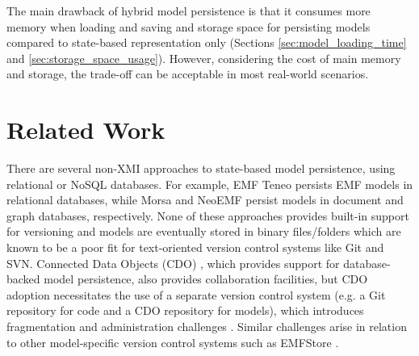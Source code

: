 \documentclass{llncs}
\begin{document}
The main drawback of hybrid model persistence is that it consumes more memory when loading and saving and storage space for persisting models compared to state-based representation only (Sections \ref{sec:model_loading_time} and \ref{sec:storage_space_usage}). However, considering the cost of main memory and storage, the trade-off can be acceptable in most real-world scenarios.

\vspace{-10pt}
\section{Related Work}
\label{sec:related_work}

\vspace{-10pt}
There are several non-XMI approaches to state-based model persistence, using relational or NoSQL databases. For example, EMF Teneo \cite{eclipse2017teneo} persists EMF models in relational databases, while Morsa \cite{DBLP:conf/models/Espinazo-PaganCM11} and NeoEMF \cite{daniel2016neoemf} persist models in document and graph databases, respectively. None of these approaches provides built-in support for versioning and models are eventually stored in binary files/folders which are known to be a poor fit for text-oriented version control systems like Git and SVN. Connected Data Objects (CDO) \cite{eclipse2017cdo}, which provides support for database-backed model persistence, also provides collaboration facilities, but CDO adoption necessitates the use of a separate version control system (e.g. a Git repository for code and a CDO repository for models), which introduces fragmentation and administration challenges \cite{barmpis2014evaluation}. Similar challenges arise in relation to other model-specific version control systems such as EMFStore \cite{koegel2010emfstore}. %
\end{document}
